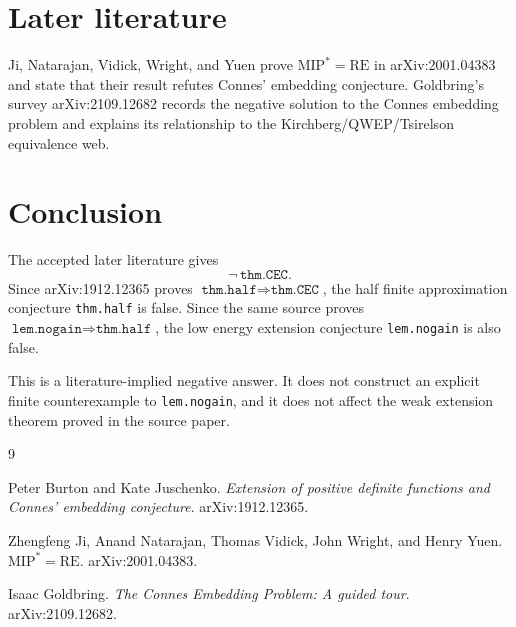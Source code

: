 \documentclass[11pt]{article}
\begin{document}
\section*{Later literature}

Ji, Natarajan, Vidick, Wright, and Yuen prove
\(\mathrm{MIP}^*=\mathrm{RE}\) in arXiv:2001.04383 and state that their result
refutes Connes' embedding conjecture. Goldbring's survey arXiv:2109.12682
records the negative solution to the Connes embedding problem and explains
its relationship to the Kirchberg/QWEP/Tsirelson equivalence web.

\section*{Conclusion}

The accepted later literature gives
\[
 \neg\,\texttt{thm.CEC}.
\]
Since arXiv:1912.12365 proves
\(\texttt{thm.half}\Rightarrow\texttt{thm.CEC}\), the half finite
approximation conjecture \texttt{thm.half} is false. Since the same source
proves \(\texttt{lem.nogain}\Rightarrow\texttt{thm.half}\), the low energy
extension conjecture \texttt{lem.nogain} is also false.

This is a literature-implied negative answer. It does not construct an
explicit finite counterexample to \texttt{lem.nogain}, and it does not affect
the weak extension theorem proved in the source paper.

\begin{thebibliography}{9}

Peter Burton and Kate Juschenko.
\newblock \emph{Extension of positive definite functions and Connes' embedding
conjecture}.
\newblock arXiv:1912.12365.

Zhengfeng Ji, Anand Natarajan, Thomas Vidick, John Wright, and Henry Yuen.
\newblock \emph{\(\mathrm{MIP}^*=\mathrm{RE}\)}.
\newblock arXiv:2001.04383.

Isaac Goldbring.
\newblock \emph{The Connes Embedding Problem: A guided tour}.
\newblock arXiv:2109.12682.

\end{thebibliography}
\end{document}
